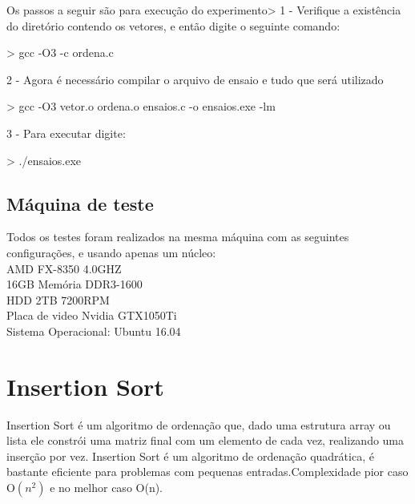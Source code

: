 \documentclass[12pt,a4paper,twoside]{report}
\begin{document}
Os passos a seguir são para execução do experimento>
1 - Verifique a existência do diretório contendo os vetores, e então digite o seguinte comando:
\begin{terminal}
    > gcc -O3 -c ordena.c
\end{terminal}
2 - Agora é necessário compilar o arquivo de ensaio e tudo que será utilizado
\begin{terminal}
    > gcc -O3 vetor.o ordena.o ensaios.c -o ensaios.exe -lm
\end{terminal}
3 - Para executar digite:
\begin{terminal}
    > ./ensaios.exe
\end{terminal}

\section{Máquina de teste}
Todos os testes foram realizados na mesma máquina com as seguintes configurações, e usando apenas um núcleo:\\
AMD FX-8350 4.0GHZ\\
16GB Memória DDR3-1600\\
HDD 2TB 7200RPM\\
Placa de video Nvidia GTX1050Ti\\
Sistema Operacional: Ubuntu 16.04\\

\chapter{Insertion Sort}
Insertion Sort é um algoritmo de ordenação que, dado uma estrutura array ou lista ele constrói uma matriz final com um elemento de cada vez, realizando uma inserção por vez. Insertion Sort é um algoritmo de ordenação quadrática, é bastante eficiente para problemas com pequenas entradas.Complexidade pior caso O$(n^2)$ e no melhor caso O(n).
\end{document}
